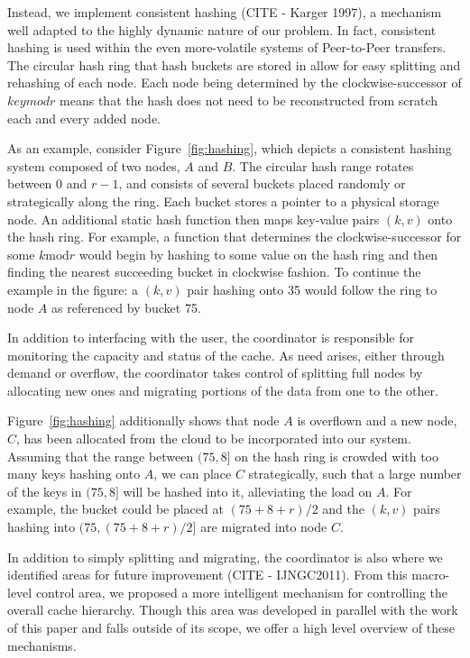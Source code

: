Instead, we implement consistent hashing (CITE - Karger 1997), a mechanism well
adapted to the highly dynamic nature of our problem. In fact, consistent
hashing is used within the even more-volatile systems of Peer-to-Peer
transfers. The circular hash ring that hash buckets are stored in allow for
easy splitting and rehashing of each node. Each node being determined by the
clockwise-successor of $key mod r$ means that the hash does not need to be
reconstructed from scratch each and every added node.

As an example, consider Figure~\ref{fig:hashing}, which depicts a consistent
hashing system composed of two nodes, $A$ and $B$. The circular hash range
rotates between $0$ and $r-1$, and consists of several buckets placed randomly
or strategically along the ring. Each bucket stores a pointer to a physical
storage node. An additional static hash function then maps key-value pairs
$(k,v)$ onto the hash ring. For example, a function that determines the
clockwise-successor for some $k \textrm{mod} r$ would begin by hashing to some
value on the hash ring and then finding the nearest succeeding bucket in
clockwise fashion. To continue the example in the figure: a $(k,v)$ pair
hashing onto 35 would follow the ring to node $A$ as referenced by bucket 75.

In addition to interfacing with the user, the coordinator is responsible for
monitoring the capacity and status of the cache. As need arises, either through
demand or overflow, the coordinator takes control of splitting full nodes by
allocating new ones and migrating portions of the data from one to the other.

Figure~\ref{fig:hashing} additionally shows that node $A$ is overflown and a
new node, $C$, has been allocated from the cloud to be incorporated into our
system. Assuming that the range between $(75,8]$ on the hash ring is crowded
with too many keys hashing onto $A$, we can place $C$ strategically, such that
a large number of the keys in $(75,8]$ will be hashed into it, alleviating the
load on $A$. For example, the bucket could be placed at $(75 + 8 + r)/2$ and
the $(k,v)$ pairs hashing into $(75, (75 + 8 + r)/2]$ are migrated into node $C$.

In addition to simply splitting and migrating, the coordinator is also where we
identified areas for future improvement (CITE - IJNGC2011). From this
macro-level control area, we proposed a more intelligent mechanism for
controlling the overall cache hierarchy. Though this area was developed in
parallel with the work of this paper and falls outside of its scope, we offer a
high level overview of these mechanisms.

